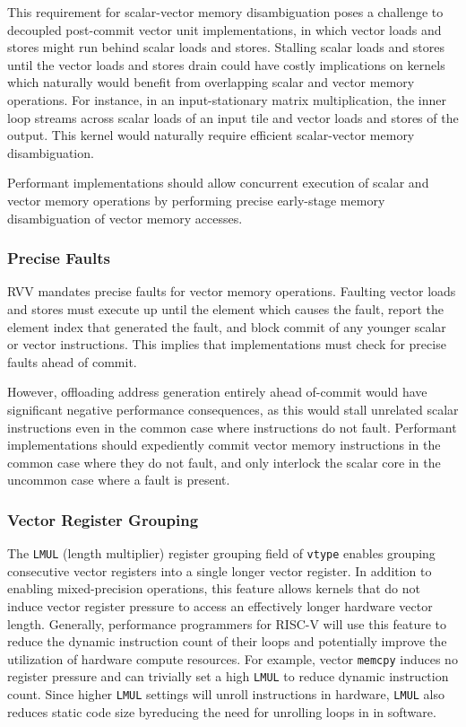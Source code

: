 This requirement for scalar-vector memory disambiguation poses a challenge to decoupled post-commit vector unit implementations, in which vector loads and stores might run behind scalar loads and stores.
Stalling scalar loads and stores until the vector loads and stores drain could have costly implications on kernels which naturally would benefit from overlapping scalar and vector memory operations.
For instance, in an input-stationary matrix multiplication, the inner loop streams across scalar loads of an input tile and vector loads and stores of the output.
This kernel would naturally require efficient scalar-vector memory disambiguation.

Performant implementations should allow concurrent execution of scalar and vector memory operations by performing precise early-stage memory disambiguation of vector memory accesses.


\subsubsection{Precise Faults}

RVV mandates precise faults for vector memory operations.
Faulting vector loads and stores must execute up until the element which causes the fault, report the element index that generated the fault, and block commit of any younger scalar or vector instructions.
This implies that implementations must check for precise faults ahead of commit.

However, offloading address generation entirely ahead of-commit would have significant negative performance consequences, as this would stall unrelated scalar instructions even in the common case where instructions do not fault.
Performant implementations should expediently commit vector memory instructions in the common case where they do not fault, and only interlock the scalar core in the uncommon case where a fault is present.


\subsubsection{Vector Register Grouping}

The \texttt{LMUL} (length multiplier) register grouping field of \texttt{vtype} enables grouping consecutive vector registers into a single longer vector register.
In addition to enabling mixed-precision operations, this feature allows kernels that do not induce vector register pressure to access an effectively longer hardware vector length.
Generally, performance programmers for RISC-V will use this feature to reduce the dynamic instruction count of their loops and potentially improve the utilization of hardware compute resources.
For example, vector \texttt{memcpy} induces no register pressure and can trivially set a high \texttt{LMUL} to reduce dynamic instruction count.
Since higher \texttt{LMUL} settings will unroll instructions in hardware, \texttt{LMUL} also reduces static code size byreducing the need for unrolling loops in in software.

